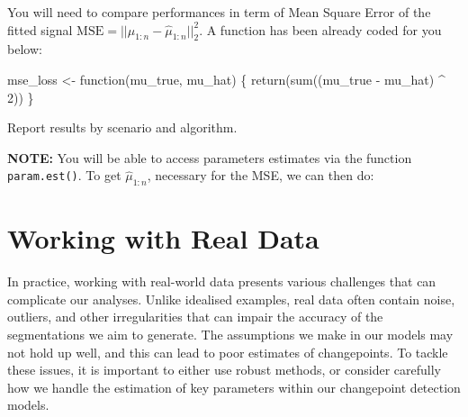 \documentclass[
  letterpaper,
  DIV=11,
  numbers=noendperiod]{scrreprt}
\newenvironment{Shaded}{\begin{snugshade}}{\end{snugshade}}
\newcommand{\AttributeTok}[1]{\textcolor[rgb]{0.40,0.45,0.13}{#1}}
\newcommand{\CommentTok}[1]{\textcolor[rgb]{0.37,0.37,0.37}{#1}}
\newcommand{\ControlFlowTok}[1]{\textcolor[rgb]{0.00,0.23,0.31}{#1}}
\newcommand{\DecValTok}[1]{\textcolor[rgb]{0.68,0.00,0.00}{#1}}
\newcommand{\FunctionTok}[1]{\textcolor[rgb]{0.28,0.35,0.67}{#1}}
\newcommand{\NormalTok}[1]{\textcolor[rgb]{0.00,0.23,0.31}{#1}}
\newcommand{\OtherTok}[1]{\textcolor[rgb]{0.00,0.23,0.31}{#1}}
\newcommand{\SpecialCharTok}[1]{\textcolor[rgb]{0.37,0.37,0.37}{#1}}
\begin{document}
You will need to compare performances in term of Mean Square Error of
the fitted signal \(\text{MSE} = ||\mu_{1:n} - \hat\mu_{1:n}||^2_2\). A
function has been already coded for you below:

\begin{Shaded}
\begin{Highlighting}[]
\NormalTok{mse\_loss }\OtherTok{\textless{}{-}} \ControlFlowTok{function}\NormalTok{(mu\_true, mu\_hat) \{}
  \FunctionTok{return}\NormalTok{(}\FunctionTok{sum}\NormalTok{((mu\_true }\SpecialCharTok{{-}}\NormalTok{ mu\_hat) }\SpecialCharTok{\^{}} \DecValTok{2}\NormalTok{))}
\NormalTok{\}}
\end{Highlighting}
\end{Shaded}

Report results by scenario and algorithm.

\textbf{NOTE:} You will be able to access parameters estimates via the
function \texttt{param.est()}. To get \(\hat\mu_{1:n}\), necessary for
the MSE, we can then do:

\begin{Shaded}
\end{Shaded}


\chapter{Working with Real Data}\label{working-with-real-data}

In practice, working with real-world data presents various challenges
that can complicate our analyses. Unlike idealised examples, real data
often contain noise, outliers, and other irregularities that can impair
the accuracy of the segmentations we aim to generate. The assumptions we
make in our models may not hold up well, and this can lead to poor
estimates of changepoints. To tackle these issues, it is important to
either use robust methods, or consider carefully how we handle the
estimation of key parameters within our changepoint detection models.
\end{document}
